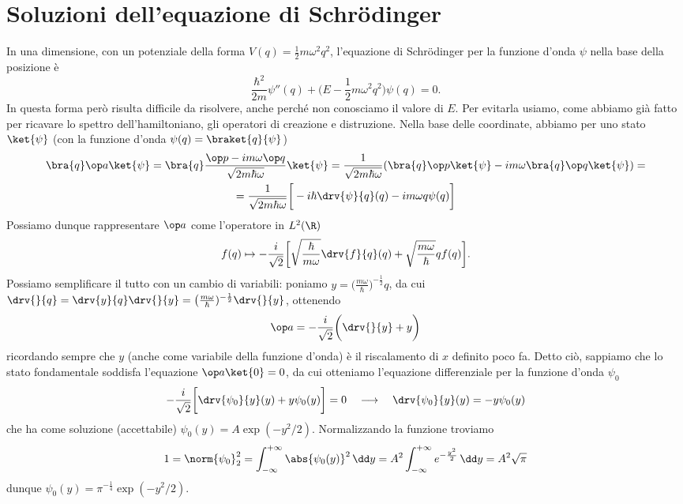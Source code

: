 \section{Soluzioni dell'equazione di Schr\"odinger}
In una dimensione, con un potenziale della forma $V(q)=\frac12m\omega^2q^2$, l'equazione di Schr\"odinger per la funzione d'onda $\psi$ nella base della posizione è
\begin{equation}
	\frac{\hbar^2}{2m}\psi''(q)+\bigg(E-\frac12m\omega^2 q^2\bigg)\psi(q)=0.
	\label{eq:schrodinger-oscillatore-1d}
\end{equation}
In questa forma però risulta difficile da risolvere, anche perch\'e non conosciamo il valore di $E$.
Per evitarla usiamo, come abbiamo già fatto per ricavare lo spettro dell'hamiltoniano, gli operatori di creazione e distruzione.
Nella base delle coordinate, abbiamo per uno stato $\ket{\psi}$ (con la funzione d'onda $\psi(q)=\braket{q}{\psi}$)
\begin{multline}
	\bra{q}\op a\ket{\psi}=\bra{q}\frac{\op p-im\omega\op q}{\sqrt{2m\hbar\omega}}\ket{\psi}=\frac1{\sqrt{2m\hbar\omega}}(\bra{q}\op p\ket{\psi}-im\omega\bra{q}\op q\ket{\psi})=\\
	=\frac1{\sqrt{2m\hbar\omega}}\bigg[-i\hbar\drv{\psi}{q}(q)-im\omega q\psi(q)\bigg]
\end{multline}
Possiamo dunque rappresentare $\op a$ come l'operatore in $L^2(\R)$
\begin{equation}
	f(q)\mapsto-\frac{i}{\sqrt{2}}\bigg[\sqrt{\frac{\hbar}{m\omega}}\drv{f}{q}(q)+\sqrt{\frac{m\omega}{\hbar}}qf(q)\bigg].
\end{equation}
Possiamo semplificare il tutto con un cambio di variabili: poniamo $y=\big(\frac{m\omega}{\hbar})^{-\frac12}q$, da cui $\drv{}{q}=\drv{y}{q}\drv{}{y}=\big(\frac{m\omega}{\hbar})^{-\frac12}\drv{}{y}$, ottenendo
\begin{equation}
	\op a=-\frac{i}{\sqrt{2}}\bigg(\drv{}{y}+y\bigg)
\end{equation}
ricordando sempre che $y$ (anche come variabile della funzione d'onda) è il riscalamento di $x$ definito poco fa.
Detto ciò, sappiamo che lo stato fondamentale soddisfa l'equazione $\op a\ket{0}=0$, da cui otteniamo l'equazione differenziale per la funzione d'onda $\psi_0$
\begin{equation}
	-\frac{i}{\sqrt{2}}\bigg[\drv{\psi_0}{y}(y)+y\psi_0(y)\bigg]=0\quad\longrightarrow\quad \drv{\psi_0}{y}(y)=-y\psi_0(y)
\end{equation}
che ha come soluzione (accettabile) $\psi_0(y)=A\exp(-y^2/2)$.
Normalizzando la funzione troviamo
\begin{equation}
	1=\norm{\psi_0}_2^2=\int_{-\infty}^{+\infty}\abs{\psi_0(y)}^2\,\dd y=A^2\int_{-\infty}^{+\infty}e^{-\frac{y^2}2}\,\dd y=A^2\sqrt{\pi}
\end{equation}
dunque $\psi_0(y)=\pi^{-\frac14}\exp(-y^2/2)$.

